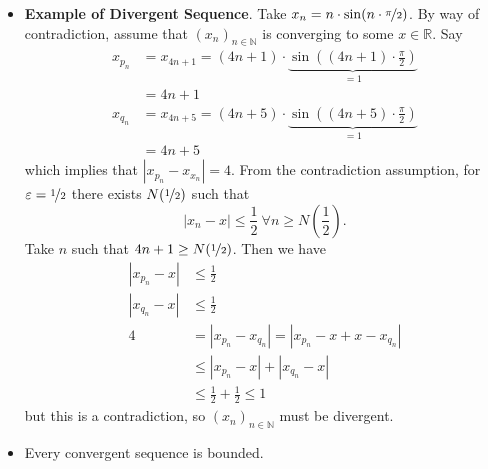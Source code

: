 \documentclass{article}
\newcommand{\R}{\mathbb{R}}
\newcommand{\N}{\mathbb{N}}
\newcommand{\seq}[2]{(#1_{#2})_{#2 \in \N}}
\newcommand{\?}{\stackrel{?}{=}}
\theoremstyle{definition} %
\begin{document}
\begin{itemize}
\begin{proof}
\begin{enumerate}[label=(\arabic*)]
            $$|x_n - l_2| \leq \varepsilon_2 \ \forall n \geq N_2(\varepsilon_2).$$
        \end{enumerate}
        Let $\varepsilon > 0$ and set $\varepsilon_1 - \nicefrac{\varepsilon}{2}, \varepsilon_2 = \nicefrac{\varepsilon}{2}$. Then we have
        \begin{align*}
            |l_1 - l_2| &= |l_1 - x_n + x_n - l_2| \\
            &\leq |l_1 - x_n| + |l_2 - x_n| \leq \varepsilon
        \end{align*}
        where $|l_1 - x_n| \leq \varepsilon_1 \ \forall n \geq N_1$ and $|l_2 - x_n| \leq \varepsilon_2 \  n \geq N_2 \ n \geq \max\{N_1, N_2\}$. Altogether, this implies that $l_1 = l_2$.
    \end{proof}
    \item \textbf{Example of Divergent Sequence}. Take $x_n = n \cdot \sin(n \cdot \nicefrac{\pi}{2})$. By way of contradiction, assume that $\seq{x}{n}$ is converging to some $x \in \R$. Say
    \begin{align*}
        x_{p_n} &= x_{4n + 1} = (4n + 1) \cdot \underbrace{\sin((4n + 1) \cdot \frac{\pi}{2})}_{= 1} \\
        &= 4n + 1 \\
        x_{q_n} &= x_{4n + 5} = (4n + 5) \cdot \underbrace{\sin((4n + 5) \cdot \frac{\pi}{2})}_{= 1} \\
        &= 4n + 5
    \end{align*}
    which implies that $|x_{p_n} - x_{x_n}| = 4$. From the contradiction assumption, for $\varepsilon = \nicefrac{1}{2}$ there exists $N(\nicefrac{1}{2})$ such that
    $$|x_n - x| \leq \frac{1}{2} \ \forall n \geq N(\frac{1}{2}).$$
    Take $n$ such that $4n + 1 \geq N(\nicefrac{1}{2})$. Then we have
    \begin{align*}
        |x_{p_n} - x| &\leq \frac{1}{2} \\
        |x_{q_n} - x| &\leq \frac{1}{2} \\
        4 &= |x_{p_n} - x_{q_n}| = |x_{p_n} - x + x - x_{q_n}| \\
        &\leq |x_{p_n} - x| + |x_{q_n} - x| \\
        &\leq \frac{1}{2} + \frac{1}{2} \leq 1
    \end{align*}
    but this is a contradiction, so $\seq{x}{n}$ must be divergent.
    \item[]
    \begin{lemma}
        Every convergent sequence is bounded.
    \end{lemma}

\end{itemize}
\end{document}
